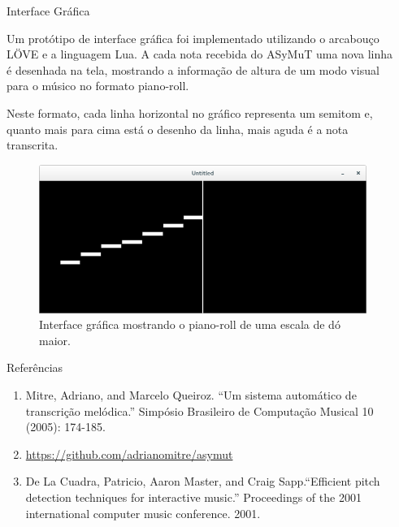 \documentclass[final,hyperref={pdfpagelabels=false}]{beamer}
\begin{document}
\begin{frame}[t]
\begin{columns}[t]
\begin{column}{.465\textwidth}
\begin{block}{Interface Gráfica}

Um protótipo de interface gráfica foi implementado utilizando o arcabouço LÖVE e a linguagem Lua. A cada nota recebida do ASyMuT uma nova linha é desenhada na tela, mostrando a informação de altura de um modo visual para o músico no formato piano-roll.

Neste formato, cada linha horizontal no gráfico representa um semitom e, quanto mais para cima está o desenho da linha, mais aguda é a nota transcrita.
\begin{figure}%
    \centering
    \includegraphics[width=0.6\linewidth]{screen2.png}
    \caption{Interface gráfica mostrando o piano-roll de uma escala de dó maior.}
    \end{figure}



\end{block}


\begin{block}{Referências}

\begin{enumerate}
\item Mitre, Adriano, and Marcelo Queiroz. ``Um sistema automático de transcrição melódica.'' Simpósio Brasileiro de Computação Musical 10 (2005): 174-185.

\item \url{https://github.com/adrianomitre/asymut}

\item De La Cuadra, Patricio, Aaron Master, and Craig Sapp.``Efficient pitch detection techniques for interactive music.'' Proceedings of the 2001 international computer music conference. 2001.
\end{enumerate}

\end{block}


\end{column} %

\begin{column}{.015\textwidth}\end{column} %

\end{columns} %

\end{frame} %
\end{document}
